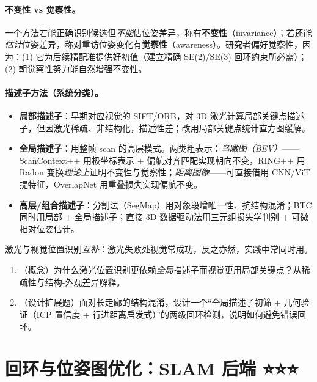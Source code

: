 \paragraph{不变性 vs 觉察性。}
一个方法若能正确识别候选但\emph{不能}估位姿差异，称有\textbf{不变性}（invariance）；若还能\emph{估计}位姿差异，称对重访位姿变化有\textbf{觉察性}（awareness）\cite{carlone2026handbook}。研究者偏好觉察性，因为：(1) 它为后续精配准提供好初值（建立精确 SE(2)/SE(3) 回环约束所必需）；(2) 朝觉察性努力能自然增强不变性。

\paragraph{描述子方法（系统分类）。}
\begin{itemize}
  \item \textbf{局部描述子}：早期对应视觉的 SIFT/ORB，对 3D 激光计算局部关键点描述子\cite{carlone2026handbook}，但因激光稀疏、非结构化，描述性差；改用局部关键点统计直方图缓解。
  \item \textbf{全局描述子}：用整帧 scan 的高层模式。两类粗表示：\emph{鸟瞰图（BEV）}——ScanContext++\cite{kim2018scancontext} 用极坐标表示 + 偏航对齐匹配实现朝向不变，RING++\cite{lu2023ringpp} 用 Radon 变换\emph{理论上}证明不变性与觉察性；\emph{距离图像}——可直接借用 CNN/ViT 提特征，OverlapNet\cite{chen2020overlapnet} 用重叠损失实现偏航不变。
  \item \textbf{高层/组合描述子}：分割法（SegMap\cite{dube2017segmap}）用对象段增唯一性、抗结构混淆；BTC 同时用局部 + 全局描述子；直接 3D 数据驱动法用三元组损失学判别 + 可微相对位姿估计\cite{carlone2026handbook}。
\end{itemize}
激光与视觉位置识别\emph{互补}：激光失败处视觉常成功，反之亦然，实践中常同时用。

\begin{practice}
\begin{enumerate}
  \item （概念）为什么激光位置识别更依赖\emph{全局}描述子而视觉更用局部关键点？从稀疏性与结构-外观差异解释。
  \item （设计扩展题）面对长走廊的结构混淆，设计一个“全局描述子初筛 + 几何验证（ICP 置信度 + 行进距离启发式）”的两级回环检测，说明如何避免错误回环。
\end{enumerate}
\end{practice}

\section{回环与位姿图优化：SLAM 后端 ⭐⭐⭐}
\label{sec:lidar-loop}

